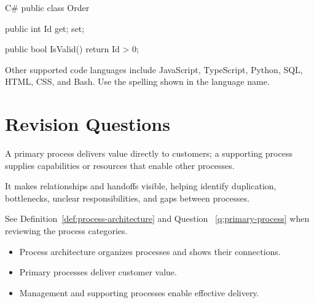 \begin{codeblock}{C\#}
public class Order
{
    public int Id { get; set; }

    public bool IsValid()
    {
        return Id > 0;
    }
}
\end{codeblock}

Other supported code languages include JavaScript, TypeScript, Python, SQL,
HTML, CSS, and Bash. Use the spelling shown in the language name.

\section{Revision Questions}

\begin{questionlist}

  {A primary process delivers value directly to customers; a supporting
  process supplies capabilities or resources that enable other processes.}

  {It makes relationships and handoffs visible, helping identify duplication,
  bottlenecks, unclear responsibilities, and gaps between processes.}
\end{questionlist}

See Definition~\ref{def:process-architecture} and Question~
\ref{q:primary-process} when reviewing the process categories.


\begin{summarybox}
\begin{itemize}
  \item Process architecture organizes processes and shows their connections.
  \item Primary processes deliver customer value.
  \item Management and supporting processes enable effective delivery.
\end{itemize}
\end{summarybox}
